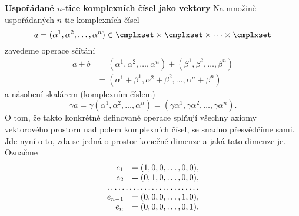 \begin{mdframed}[style=mdexam]
  \begin{example}\label{mai:exam107}
    \textbf{Uspořádané \(n\)-tice komplexních čísel jako vektory}\newline
    Na množině uspořádaných \(n\)-tic komplexních čísel
    \begin{equation*}
      a=(\alpha^1,\alpha^2,\ldots,\alpha^n)\in\cmplxset\times\cmplxset\times\cdots\times\cmplxset
    \end{equation*}
    zavedeme operace sčítání
    \begin{align}
      a + b &= (\alpha^1,\alpha^2,\ldots,\alpha^n) + (\beta^1,\beta^2,\ldots,\beta^n)   \nonumber\\
            &= (\alpha^1+ \beta^1,\alpha^2 +\beta^2,\ldots,\alpha^n + \beta^n)    \label{mai:eq098}
    \end{align}
    a násobení skalárem (komplexním číslem)
    \begin{equation}\label{mai:eq099}
      \gamma a = \gamma(\alpha^1,\alpha^2,\ldots,\alpha^n) 
               = (\gamma\alpha^1,\gamma\alpha^2,\ldots,\gamma\alpha^n). 
    \end{equation}
    O tom, že takto konkrétně definované operace splňují všechny axiomy vektorového prostoru nad
    polem komplexních čísel, se snadno přesvědčíme sami. Jde nyní o to, zda se jedná o prostor
    konečné dimenze a jaká tato dimenze je. Označme
    \begingroup
    \setlength{\arraycolsep}{0pt}
    \begin{equation*}
    \begin{array}{rl}
      e_1     &= (1, 0, 0, \ldots, 0, 0),  \\
      e_2     &= (0, 1, 0, \ldots, 0, 0),  \\
      \hdotsfor{2}                         \\
      e_{n-1} &= (0, 0, 0, \ldots, 1, 0),  \\
      e_n     &= (0, 0, 0, \ldots, 0, 1).
    \end{array}
    \end{equation*}
    \endgroup
  \end{example}
\end{mdframed}